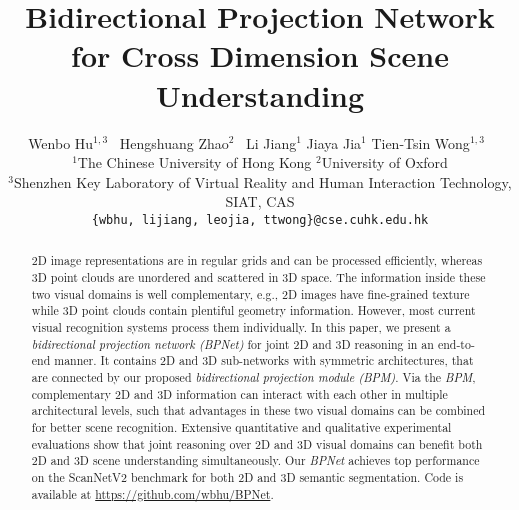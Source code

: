 \documentclass[final]{cvpr}
\begin{document}
	
\title{Bidirectional Projection Network for Cross Dimension Scene Understanding}
	
\author{Wenbo Hu$^{1,3}$\footnotemark[1]~ \quad Hengshuang Zhao$^{2}$\footnotemark[1]~ \quad Li Jiang$^{1}$ \quad Jiaya Jia$^{1}$ \quad Tien-Tsin Wong$^{1,3}$\footnotemark[2]~\\
	$^{1}$The Chinese University of Hong Kong \quad $^{2}$University of Oxford \\ $^{3}$Shenzhen Key Laboratory of Virtual Reality and Human Interaction Technology, SIAT, CAS\\ 
{\tt\small \{wbhu, lijiang, leojia, ttwong\}@cse.cuhk.edu.hk} 
}



\maketitle  \renewcommand{\thefootnote}{\fnsymbol{footnote}}
 

\pagestyle{empty}
\thispagestyle{empty}

\begin{abstract}
2D image representations are in regular grids and can be processed efficiently, whereas 3D point clouds are unordered and scattered in 3D space. 
The information inside these two visual domains is well complementary, e.g., 2D images have fine-grained texture while 3D point clouds contain plentiful geometry information.
However, most current visual recognition systems process them individually.
In this paper, we present a \emph{bidirectional projection network (BPNet)} for joint 2D and 3D reasoning in an end-to-end manner.
It contains 2D and 3D sub-networks with symmetric architectures, that are connected by our proposed \emph{bidirectional projection module (BPM)}.
Via the \emph{BPM}, complementary 2D and 3D information can interact with each other in multiple architectural levels, such that advantages in these two visual domains can be combined for better scene recognition.
Extensive quantitative and qualitative experimental evaluations show that joint reasoning over 2D and 3D visual domains can benefit both 2D and 3D scene understanding simultaneously.
Our \emph{BPNet} achieves top performance on the ScanNetV2 benchmark for both 2D and 3D semantic segmentation.
Code is available at \url{https://github.com/wbhu/BPNet}.
	

\end{abstract}
\end{document}
